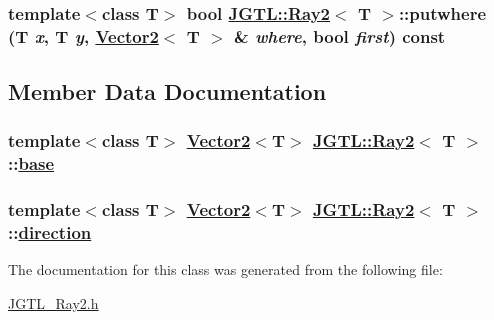 \hypertarget{class_j_g_t_l_1_1_ray2_206fd5a155f3d460b878ea94f8df3eb2}{
\subsubsection[putwhere]{\setlength{\rightskip}{0pt plus 5cm}template$<$class T$>$ bool \hyperlink{class_j_g_t_l_1_1_ray2}{JGTL::Ray2}$<$ T $>$::putwhere (T {\em x}, T {\em y}, \hyperlink{class_j_g_t_l_1_1_vector2}{Vector2}$<$ T $>$ \& {\em where}, bool {\em first}) const}}
\label{class_j_g_t_l_1_1_ray2_206fd5a155f3d460b878ea94f8df3eb2}




\subsection{Member Data Documentation}
\hypertarget{class_j_g_t_l_1_1_ray2_5a70c3e1b6e6e940feaf0a45ab377f34}{
\subsubsection[base]{\setlength{\rightskip}{0pt plus 5cm}template$<$class T$>$ \hyperlink{class_j_g_t_l_1_1_vector2}{Vector2}$<$T$>$ \hyperlink{class_j_g_t_l_1_1_ray2}{JGTL::Ray2}$<$ T $>$::\hyperlink{class_j_g_t_l_1_1_ray2_5a70c3e1b6e6e940feaf0a45ab377f34}{base}}}
\label{class_j_g_t_l_1_1_ray2_5a70c3e1b6e6e940feaf0a45ab377f34}


\hypertarget{class_j_g_t_l_1_1_ray2_cb20b77d19a22288144189f326a4fa79}{
\subsubsection[direction]{\setlength{\rightskip}{0pt plus 5cm}template$<$class T$>$ \hyperlink{class_j_g_t_l_1_1_vector2}{Vector2}$<$T$>$ \hyperlink{class_j_g_t_l_1_1_ray2}{JGTL::Ray2}$<$ T $>$::\hyperlink{class_j_g_t_l_1_1_ray2_cb20b77d19a22288144189f326a4fa79}{direction}}}
\label{class_j_g_t_l_1_1_ray2_cb20b77d19a22288144189f326a4fa79}




The documentation for this class was generated from the following file:\begin{CompactItemize}
\item 
\hyperlink{_j_g_t_l___ray2_8h}{JGTL\_\-Ray2.h}\end{CompactItemize}
